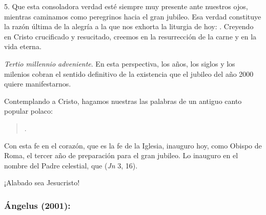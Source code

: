 \begin{body}
				5. Que esta consoladora verdad esté siempre muy presente ante nuestros ojos, mientras caminamos como peregrinos hacia el gran jubileo. Esa verdad constituye la razón última de la alegría a la que nos exhorta la liturgia de hoy: . Creyendo en Cristo crucificado y resucitado, creemos en la resurrección de la carne y en la vida eterna. 
				
				\emph{Tertio millennio adveniente}. En esta perspectiva, los años, los siglos y los milenios cobran el sentido definitivo de la existencia que el jubileo del año 2000 quiere manifestarnos. 
				
				Contemplando a Cristo, hagamos nuestras las palabras de un antiguo canto popular polaco: 
				
				\begin{quote} . \end{quote} 
				
				Con esta fe en el corazón, que es la fe de la Iglesia, inauguro hoy, como Obispo de Roma, el tercer año de preparación para el gran jubileo. Lo inauguro en el nombre del Padre celestial, que  (\emph{Jn} 3, 16). 
				
				¡Alabado sea Jesucristo!
				
			\end{body}
	
		\subsubsection{Ángelus (2001): }
			
